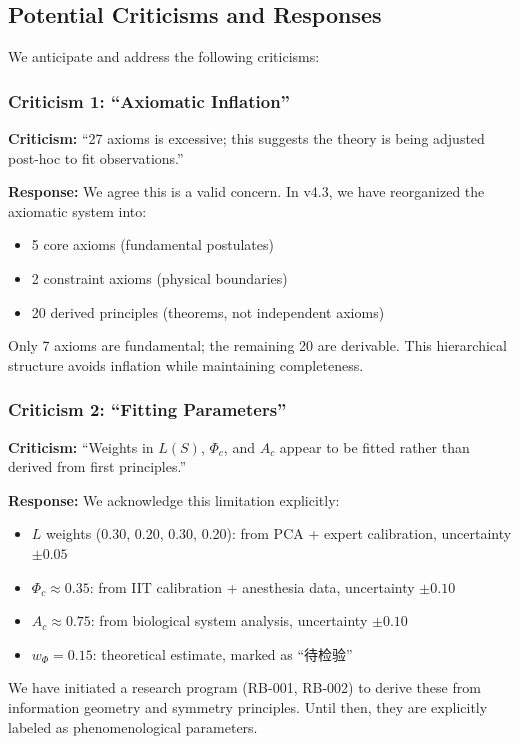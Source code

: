 \documentclass[12pt,a4paper]{article}
\begin{document}
\subsection{Potential Criticisms and Responses}

We anticipate and address the following criticisms:

\subsubsection{Criticism 1: ``Axiomatic Inflation''}

\textbf{Criticism:} ``27 axioms is excessive; this suggests the theory is being adjusted post-hoc to fit observations.''

\textbf{Response:} We agree this is a valid concern. In v4.3, we have reorganized the axiomatic system into:
\begin{itemize}
\item 5 core axioms (fundamental postulates)
\item 2 constraint axioms (physical boundaries)
\item 20 derived principles (theorems, not independent axioms)
\end{itemize}
Only 7 axioms are fundamental; the remaining 20 are derivable. This hierarchical structure avoids inflation while maintaining completeness.

\subsubsection{Criticism 2: ``Fitting Parameters''}

\textbf{Criticism:} ``Weights in $L(S)$, $\Phi_c$, and $A_c$ appear to be fitted rather than derived from first principles.''

\textbf{Response:} We acknowledge this limitation explicitly:
\begin{itemize}
\item $L$ weights (0.30, 0.20, 0.30, 0.20): from PCA + expert calibration, uncertainty $\pm 0.05$
\item $\Phi_c \approx 0.35$: from IIT calibration + anesthesia data, uncertainty $\pm 0.10$
\item $A_c \approx 0.75$: from biological system analysis, uncertainty $\pm 0.10$
\item $w_\Phi = 0.15$: theoretical estimate, marked as ``待检验''
\end{itemize}
We have initiated a research program (RB-001, RB-002) to derive these from information geometry and symmetry principles. Until then, they are explicitly labeled as phenomenological parameters.
\end{document}
